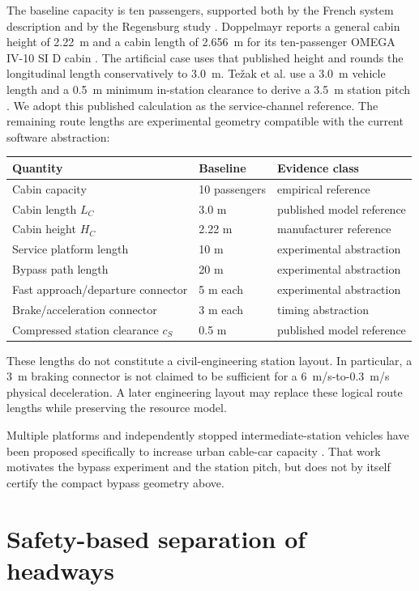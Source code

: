 \documentclass[11pt,a4paper]{scrartcl}
\begin{document}
The baseline capacity is ten passengers, supported both by the French system
description and by the Regensburg study \cite{strmtgGondola,haimerl2022}.
Doppelmayr reports a general cabin height of 2.22~m and a cabin length of
2.656~m for its ten-passenger OMEGA IV-10 SI D cabin \cite{doppelmayrDLine}.
The artificial case uses that published height and rounds the longitudinal
length conservatively to 3.0~m.
Te\v{z}ak et al. use a 3.0~m vehicle length and a 0.5~m minimum in-station
clearance to derive a 3.5~m station pitch \cite{tezak2016}.  We adopt this
published calculation as the service-channel reference.  The remaining route
lengths are experimental geometry compatible with the current software
abstraction:
\begin{center}
\begin{tabular}{@{}lll@{}}
\toprule
Quantity & Baseline & Evidence class \\
\midrule
Cabin capacity & 10 passengers & empirical reference \\
Cabin length $L_C$ & 3.0 m & published model reference \\
Cabin height $H_C$ & 2.22 m & manufacturer reference \\
Service platform length & 10 m & experimental abstraction \\
Bypass path length & 20 m & experimental abstraction \\
Fast approach/departure connector & 5 m each & experimental abstraction \\
Brake/acceleration connector & 3 m each & timing abstraction \\
Compressed station clearance $c_S$ & 0.5 m & published model reference \\
\bottomrule
\end{tabular}
\end{center}
These lengths do not constitute a civil-engineering station layout.  In
particular, a 3~m braking connector is not claimed to be sufficient for a
6~m/s-to-0.3~m/s physical deceleration.  A later engineering layout may replace
these logical route lengths while preserving the resource model.

Multiple platforms and independently stopped intermediate-station vehicles
have been proposed specifically to increase urban cable-car capacity
\cite{tezak2016}.  That work motivates the bypass experiment and the station
pitch, but does not by itself certify the compact bypass geometry above.

\section{Safety-based separation of headways}
\end{document}
